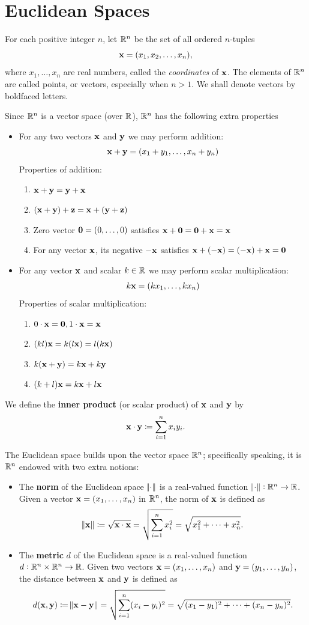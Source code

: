 \section{Euclidean Spaces}
For each positive integer $n$, let $\mathbb R^n$ be the set of all ordered $n$-tuples
\[ \vb{x}=(x_1,x_2,\dots,x_n), \]
where $x_1,\dots,x_n$ are real numbers, called the \emph{coordinates} of $\vb{x}$. The elements of $\mathbb R^n$ are called points, or vectors, especially when $n>1$. We shall denote vectors by boldfaced letters.

Since $\mathbb R^n$ is a vector space (over $\mathbb R$), $\mathbb R^n$ has the following extra properties
\begin{itemize}
\item For any two vectors $\vb{x}$ and $\vb{y}$ we may perform addition:
\[ \vb{x}+\vb{y}=(x_1+y_1,\dots,x_n+y_n) \]
Properties of addition:
\begin{enumerate}
\item $\vb{x}+\vb{y}=\vb{y}+\vb{x}$
\item $(\vb{x}+\vb{y})+\vb{z}=\vb{x}+(\vb{y}+\vb{z})$
\item Zero vector $\vb{0}=(0,\dots,0)$ satisfies $\vb{x}+\vb{0}=\vb{0}+\vb{x}=\vb{x}$
\item For any vector $\vb{x}$, its negative $-\vb{x}$ satisfies $\vb{x}+(-\vb{x})=(-\vb{x})+\vb{x}=\vb{0}$
\end{enumerate}
\item For any vector $\vb{x}$ and scalar $k\in\mathbb R$ we may perform scalar multiplication:
\[ k\vb{x}=(kx_1,\dots,kx_n) \]
Properties of scalar multiplication:
\begin{enumerate}
\item $0\cdot\vb{x}=\vb{0},1\cdot\vb{x}=\vb{x}$
\item $(kl)\vb{x}=k(l\vb{x})=l(k\vb{x})$
\item $k(\vb{x}+\vb{y})=k\vb{x}+k\vb{y}$
\item $(k+l)\vb{x}=k\vb{x}+l\vb{x}$
\end{enumerate}
\end{itemize}

We define the \textbf{inner product} (or scalar product) of $\vb{x}$ and $\vb{y}$ by
\[ \vb{x}\cdot\vb{y}\coloneqq\sum_{i=1}^nx_iy_i. \]

The Euclidean space builds upon the vector space $\mathbb R^n$; specifically speaking, it is $\mathbb R^n$ endowed with two extra notions:
\begin{itemize}
\item The \textbf{norm} of the Euclidean space $\norm{\cdot}$ is a real-valued function $\norm{\cdot}:\mathbb R^n\to\mathbb R$. Given a vector $\vb{x}=(x_1,\dots,x_n)$ in $\mathbb R^n$, the norm of $\vb{x}$ is defined as
\[ \norm{\vb{x}}\coloneqq\sqrt{\vb{x}\cdot\vb{x}}=\sqrt{\sum_{i=1}^nx_i^2}=\sqrt{x_1^2+\cdots+x_n^2}. \]
\item The \textbf{metric} $d$ of the Euclidean space is a real-valued function $d:\mathbb R^n\times\mathbb R^n\to\mathbb R$. Given two vectors $\vb{x}=(x_1,\dots,x_n)$ and $\vb{y}=(y_1,\dots,y_n)$, the distance between $\vb{x}$ and $\vb{y}$ is defined as
\[ d(\vb{x},\vb{y})\coloneqq\norm{\vb{x}-\vb{y}}=\sqrt{\sum_{i=1}^n(x_i-y_i)^2}=\sqrt{(x_1-y_1)^2+\cdots+(x_n-y_n)^2}. \]
\end{itemize}


